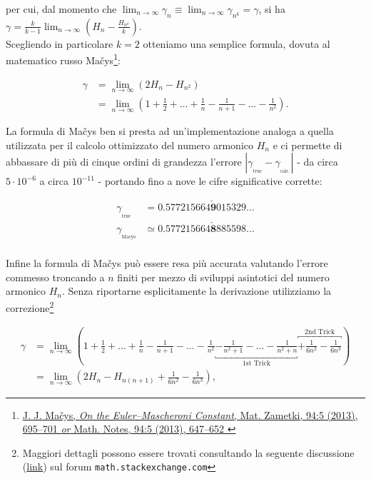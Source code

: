 per cui, dal momento che $\displaystyle\lim_{n \to\infty}\gamma_n\equiv \displaystyle\lim_{n \to\infty}\gamma_{n^k} = \gamma$, si ha $\gamma = \displaystyle\frac{k}{k-1}\lim_{n \to\infty}\left(H_n - \frac{H_{n^k}}{k}\right)$.\\

Scegliendo in particolare $k=2$ otteniamo una semplice formula, dovuta al matematico russo Mačys\footnote{\href{https://doi.org/10.4213/mzm9386}{J. J. Mačys, \emph{On the Euler–Mascheroni Constant}, Mat. Zametki, 94:5 (2013), 695–701 \emph{or} Math. Notes, 94:5 (2013), 647–652 }}:


\begin{align}
\gamma &= \lim_{n \to\infty}\left(2H_n - H_{n^2}\right)\nonumber\\
&= \lim_{n \to\infty}\left(1 +\frac{1}{2} + \dots + \frac{1}{n} - \frac{1}{n+1} - \dots - \frac{1}{n^2}\right).
\end{align}\bigskip

\noindent La formula di Mačys ben si presta ad un'implementazione analoga a quella utilizzata per il calcolo ottimizzato del numero armonico $H_n$ e ci permette di abbassare di più di cinque ordini di grandezza l'errore $|\gamma_{_\mathrm{true}}  - \gamma_{_\mathrm{calc.}} |$ - da circa $5\cdot10^{-6}$ a circa $10^{-11}$ - portando fino a nove le cifre significative corrette:

\begin{align*}
\gamma_{_\mathrm{true}}  &= 0.577215664\mathbf{\check{9}}015329\dots\\
\gamma_{_\mathrm{Macys}} &\simeq 0.577215664\mathbf{\check{8}}885598\dots\\
\end{align*}

\noindent Infine la formula di Mačys può essere resa più accurata valutando l'errore commesso troncando a $n$ finiti per mezzo di sviluppi asintotici del numero armonico $H_n$. Senza riportarne esplicitamente la derivazione utilizziamo la correzione\footnote{Maggiori dettagli possono essere trovati consultando la seguente discussione (\href{https://math.stackexchange.com/questions/129777/what-is-the-fastest-most-efficient-algorithm-for-estimating-eulers-constant-g}{link}) sul forum \texttt{math.stackexchange.com}}

\begin{align}
\gamma &=  \lim_{n \to\infty}\left(1 +\frac{1}{2} + \dots + \frac{1}{n} - \frac{1}{n+1} - \dots - \frac{1}{n^2} \underbracket{-\frac{1}{n^2 + 1} - \dots - \frac{1}{n^2 + n}}_{\text{1st Trick}} \overbracket{+\frac{1}{6n^2} - \frac{1}{6n^3}}^{\text{2nd Trick}}\right)\\
&= \lim_{n \to\infty}\left(2H_n - H_{n(n+1)} + \frac{1}{6n^2} - \frac{1}{6n^3}\right),\nonumber
\end{align}

